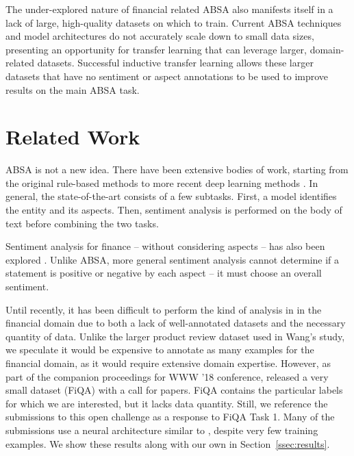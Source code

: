 \documentclass[11pt,a4paper]{article}
\begin{document}
The under-explored nature of financial related ABSA also manifests itself in a lack of large, high-quality datasets on which to train. Current ABSA techniques and model architectures do not accurately scale down to small data sizes, presenting an opportunity for transfer learning that can leverage larger, domain-related datasets. Successful inductive transfer learning allows these larger datasets that have no sentiment or aspect annotations to be used to improve results on the main ABSA task.

\section{Related Work}

ABSA is not a new idea. There have been extensive bodies of work, starting from the original rule-based methods \cite{thet2010aspect} to more recent deep learning methods \cite{wang2015deep}. In general, the state-of-the-art consists of a few subtasks. First, a model identifies the entity and its aspects. Then, sentiment analysis is performed on the body of text before combining the two tasks. 

Sentiment analysis for finance -- without considering aspects -- has also been explored \cite{cortis-EtAl:2017:SemEval}. Unlike ABSA, more general sentiment analysis cannot determine if a statement is positive or negative by each aspect -- it must choose an overall sentiment.

Until recently, it has been difficult to perform the kind of analysis in  in the financial domain due to both a lack of well-annotated datasets and the necessary quantity of data. Unlike the larger product review dataset \cite{pontiki2016semeval} used in Wang's study, we speculate it would be expensive to annotate as many examples for the financial domain, as it would require extensive domain expertise. However, as part of the companion proceedings for WWW '18 conference,  released a very small dataset (FiQA) with a call for papers. FiQA contains the particular labels for which we are interested, but it lacks data quantity. Still, we reference the submissions to this open challenge as a response to FiQA Task 1. Many of the submissions \cite{jangid2018aspect, Chen:2018, deFrancaCosta:2018} use a neural architecture similar to , despite very few training examples. We show these results along with our own in Section~\ref{ssec:results}.
\end{document}
